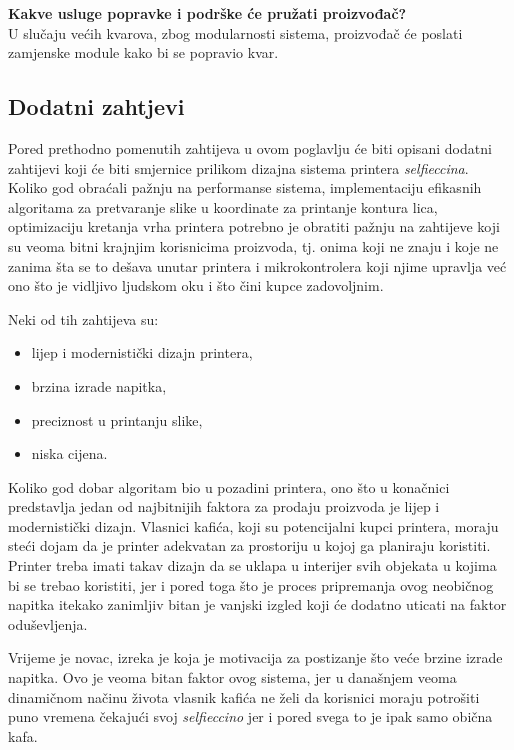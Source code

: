 \documentclass[12pt]{article}
\begin{document}
\textbf{Kakve usluge popravke i podrške će pružati proizvođač?}\\
U slučaju većih kvarova, zbog modularnosti sistema, proizvođač će poslati zamjenske module kako bi se popravio kvar.  

\subsection{Dodatni zahtjevi}
Pored prethodno pomenutih zahtijeva u ovom poglavlju \'ce biti opisani dodatni zahtijevi koji \'ce biti smjernice prilikom dizajna sistema printera \textit{selfieccina}. Koliko god obra\'cali pa\v{z}nju na performanse sistema, implementaciju efikasnih algoritama za pretvaranje slike u koordinate za printanje kontura lica, optimizaciju kretanja vrha printera potrebno je obratiti pa\v{z}nju na zahtijeve koji su veoma bitni krajnjim korisnicima proizvoda, tj. onima koji ne znaju i koje ne zanima \v{s}ta se to de\v{s}ava unutar printera i mikrokontrolera koji njime upravlja ve\'c ono \v{s}to je vidljivo ljudskom oku i \v{s}to \v{c}ini kupce zadovoljnim.

Neki od tih zahtijeva su:
\begin{itemize}
\item lijep i modernisti\v{c}ki dizajn printera,
\item brzina izrade napitka,
\item preciznost u printanju slike,
\item niska cijena.
\end{itemize}

Koliko god dobar algoritam bio u pozadini printera, ono \v{s}to u kona\v{c}nici predstavlja jedan od najbitnijih faktora za prodaju proizvoda je lijep i modernisti\v{c}ki dizajn. Vlasnici kafi\'ca, koji su potencijalni kupci printera, moraju ste\'ci dojam da je printer adekvatan za prostoriju u kojoj ga planiraju koristiti. Printer treba imati takav dizajn da se uklapa u interijer svih objekata u kojima bi se trebao koristiti, jer i pored toga \v{s}to je proces pripremanja ovog neobi\v{c}nog napitka itekako zanimljiv bitan je vanjski izgled koji \'ce dodatno uticati na faktor odu\v{s}evljenja.

\newpage

Vrijeme je novac, izreka je koja je motivacija za postizanje \v{s}to ve\'ce brzine izrade napitka. Ovo je veoma bitan faktor ovog sistema, jer u dana\v{s}njem veoma dinami\v{c}nom na\v{c}inu \v{z}ivota vlasnik kafi\'ca ne \v{z}eli da korisnici moraju potro\v{s}iti puno vremena \v{c}ekaju\'ci svoj \textit{selfieccino} jer i pored svega to je ipak samo obi\v{c}na kafa.
\end{document}
